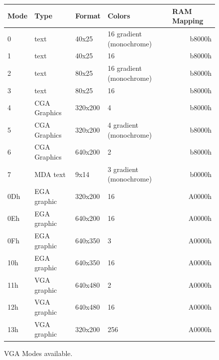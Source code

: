 \documentclass[book.tex]{subfiles}
\begin{document}
\begin{figure}[H]
\centering
\begin{table}[H]
\begin{tabularx}{\textwidth}[c]{llllr}
\hline
\textbf{Mode} & \textbf{Type} & \textbf{Format} & \textbf{Colors}          & \multicolumn{1}{l}{\textbf{RAM Mapping}} \\ \hline
0             & text          & 40x25           & 16 gradient (monochrome) & b8000h                                \\ \hline
1             & text          & 40x25           & 16                       & b8000h                                \\ \hline
2             & text          & 80x25           & 16 gradient (monochrome) & b8000h                                \\ \hline
3             & text          & 80x25           & 16                       & b8000h                                \\ \hline
4             & CGA Graphics  & 320x200         & 4                        & b8000h                                \\ \hline
5             & CGA Graphics  & 320x200         & 4 gradient (monochrome)  & b8000h                                \\ \hline
6             & CGA Graphics  & 640x200         & 2                        & b8000h                                \\ \hline
7             & MDA text      & 9x14            & 3 gradient (monochrome)  & b0000h                                \\ \hline
0Dh           & EGA graphic   & 320x200         & 16                       & A0000h                                \\ \hline
0Eh           & EGA graphic   & 640x200         & 16                       & A0000h                                \\ \hline
0Fh           & EGA graphic   & 640x350         & 3                        & A0000h                                \\ \hline
10h           & EGA graphic   & 640x350         & 16                       & A0000h                                \\ \hline
11h           & VGA graphic   & 640x480         & 2                        & A0000h                                \\ \hline
12h           & VGA graphic   & 640x480         & 16                       & A0000h                                \\ \hline
13h           & VGA graphic   & 320x200         & 256                      & A0000h                                \\ \hline
\end{tabularx}
\end{table}
\caption{VGA Modes available.}\label{fig:vga_modes}
 \end{figure}
 
\end{document}
